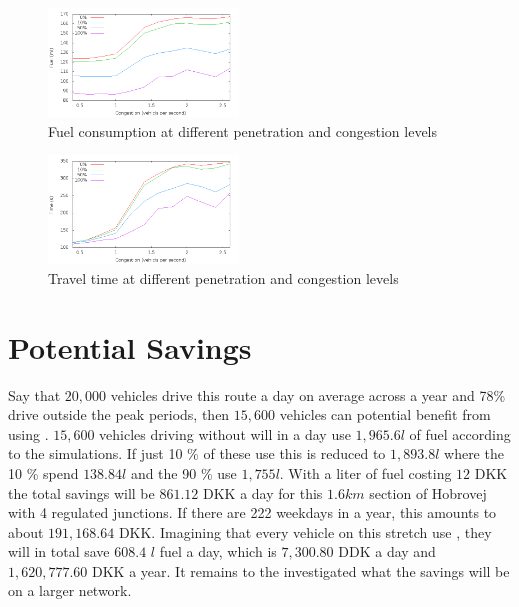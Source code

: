 \begin{figure}[htb]
\includegraphics[width=0.45\textwidth]{../images/fuelCongestion.png}
\caption{Fuel consumption at different penetration and congestion levels}
\label{fig:TestResults:congestionFuel}
\end{figure}
\begin{figure}[htb]
\includegraphics[width=0.45\textwidth]{../images/timeCongestion.png}
\caption{Travel time at different penetration and congestion levels}
\label{fig:TestResults:congestionTime}
\end{figure}

\section{Potential Savings}%
Say that $20,000$ vehicles drive this route a day on average across a year and 78\% drive outside the peak periods, then $15,600$ vehicles can potential benefit from using \tech\cite{}.%
$15,600$ vehicles driving without \tech will in a day use $1,965.6 l$ of fuel according to the simulations.
If just 10 \% of these use \tech this is reduced to $1,893.8 l$ where the 10 \% spend $138.84 l$ and the 90 \% use $1,755 l$.
With a liter of fuel costing $12$ DKK the total savings will be $861.12$ DKK a day for this $1.6 km$ section of Hobrovej with 4 regulated junctions.
If there are 222 weekdays in a year, this amounts to about $191,168.64$ DKK.
Imagining that every vehicle on this stretch use \tech, they will in total save $608.4$ $l$ fuel a day, which is $7,300.80$ DDK a day and $1,620,777.60$ DKK a year.
It remains to the investigated what the savings will be on a larger network.






